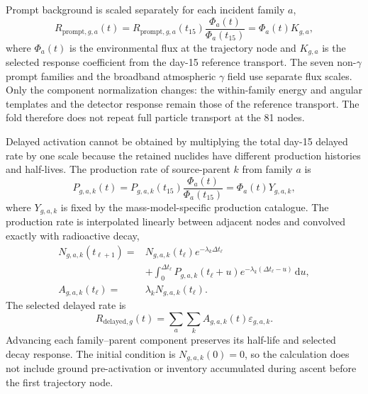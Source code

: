 \documentclass[11pt]{article}
\begin{document}
Prompt background is scaled separately for each incident family $a$,
\begin{equation}
 R_{\mathrm{prompt},g,a}(t)
 =R_{\mathrm{prompt},g,a}(t_{15})
 \frac{\Phi_a(t)}{\Phi_a(t_{15})}
 =\Phi_a(t)K_{g,a},
 \label{eq:prompt_source_response}
\end{equation}
where $\Phi_a(t)$ is the environmental flux at the trajectory node and
$K_{g,a}$ is the selected response coefficient from the day-15 reference
transport. The seven non-$\gamma$ prompt families and the broadband atmospheric
$\gamma$ field use separate flux scales. Only the component normalization
changes: the within-family energy and angular templates and the detector
response remain those of the reference transport. The fold therefore does not
repeat full particle transport at the 81 nodes.

Delayed activation cannot be obtained by multiplying the total day-15 delayed
rate by one scale because the retained nuclides have different production
histories and half-lives. The production rate of source-parent $k$ from family
$a$ is
\begin{equation}
 P_{g,a,k}(t)
 =P_{g,a,k}(t_{15})\frac{\Phi_a(t)}{\Phi_a(t_{15})}
 =\Phi_a(t)Y_{g,a,k},
 \label{eq:activation_production}
\end{equation}
where $Y_{g,a,k}$ is fixed by the mass-model-specific production catalogue.
The production rate is interpolated linearly between adjacent nodes and
convolved exactly with radioactive decay,
\begin{equation}
 \begin{aligned}
 N_{g,a,k}(t_{\ell+1})={}&N_{g,a,k}(t_\ell)e^{-\lambda_k\Delta t_\ell}\\
 &+\int_0^{\Delta t_\ell}P_{g,a,k}(t_\ell+u)
 e^{-\lambda_k(\Delta t_\ell-u)}\,\mathrm du,\\
 A_{g,a,k}(t_\ell)={}&\lambda_kN_{g,a,k}(t_\ell).
 \end{aligned}
 \label{eq:delayed_inventory}
\end{equation}
The selected delayed rate is
\begin{equation}
 R_{\mathrm{delayed},g}(t)=
 \sum_a\sum_k A_{g,a,k}(t)\varepsilon_{g,a,k}.
 \label{eq:delayed_selected}
\end{equation}
Advancing each family--parent component preserves its half-life and selected
decay response. The initial condition is $N_{g,a,k}(0)=0$, so the calculation
does not include ground pre-activation or inventory accumulated during ascent
before the first trajectory node.
\end{document}

